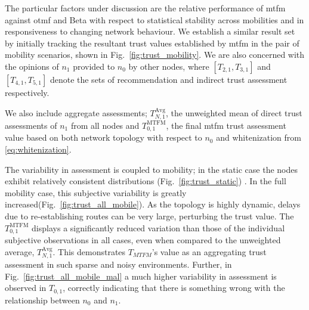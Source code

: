 The particular factors under discussion are the relative performance of \gls{mtfm} against \gls{otmf} and Beta with respect to statistical stability across mobilities and in responsiveness to changing network behaviour. 
We establish a similar result set by initially tracking the resultant trust values established by \gls{mtfm} in the pair of mobility scenarios, shown in Fig.~\ref{fig:trust_mobility}.
We are also concerned with the opinions of $n_1$ provided to $n_0$ by other nodes, where $[T_{2,1},T_{3,1}]$ and $[T_{4,1},T_{5,1}]$ denote the sets of recommendation and indirect trust assessment respectively.

We also include aggregate assessments; $T_{N,1}^\text{Avg}$, the unweighted mean of direct trust assessments of $n_1$ from all nodes and $T_{0,1}^\text{MTFM}$, the final \gls{mtfm} trust assessment value based on both network topology with respect to $n_0$ and whitenization from \autoref{eq:whitenization}.

The variability in assessment is coupled to mobility; in the static case the nodes exhibit relatively consistent distributions (Fig.~\ref{fig:trust_static}) .
In the full mobility case, this subjective variability is greatly increased(Fig.~\ref{fig:trust_all_mobile}). 
As the topology is highly dynamic, delays due to re-establishing routes can be very large, perturbing the trust value.
The $T_{0,1}^\text{MTFM}$ displays a significantly reduced variation than those of the individual subjective observations in all cases, even when compared to the unweighted average, $T_{N,1}^\text{Avg}$.
This demonstrates $T_{MTFM}$'s value as an aggregating trust assessment in such sparse and noisy environments.
Further, in Fig.~\ref{fig:trust_all_mobile_mal} a much higher variability in assessment is observed in $T_{0,1}$, correctly indicating that there is something wrong with the relationship between $n_0$ and $n_1$.

